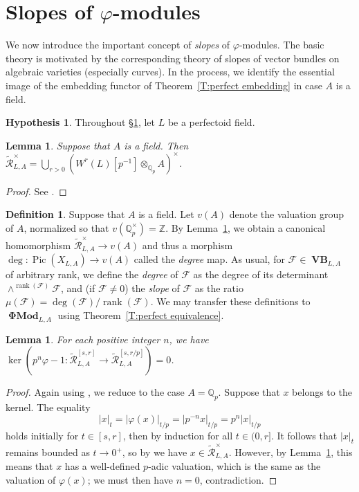 \documentclass[12pt]{amsart}
\newtheorem{lemma}[theorem]{Lemma}
\theoremstyle{definition}
\newtheorem{defn}[theorem]{Definition}
\newtheorem{hypothesis}[theorem]{Hypothesis}
\numberwithin{equation}{theorem}
\newcommand{\QQ}{\mathbb{Q}}
\newcommand{\ZZ}{\mathbb{Z}}
\newcommand{\calF}{\mathcal{F}}
\newcommand{\calR}{\mathcal{R}}
\DeclareMathOperator{\PhiMod}{\mathbf{\Phi Mod}}
\DeclareMathOperator{\Pic}{Pic}
\DeclareMathOperator{\rank}{rank}
\DeclareMathOperator{\VB}{\mathbf{VB}}
\begin{document}
\section{Slopes of \texorpdfstring{$\varphi$}{phi}-modules}
\label{sec:slopes}

We now introduce the important concept of \emph{slopes} of $\varphi$-modules. The basic theory is motivated by the corresponding theory of slopes of vector bundles on algebraic varieties (especially curves). In the process, we identify the essential image of the embedding functor of Theorem~\ref{T:perfect embedding} in case $A$ is a field.

\begin{hypothesis}
Throughout \S\ref{sec:slopes}, let $L$ be a perfectoid field.
\end{hypothesis}

\begin{lemma} \label{L:units}
Suppose that $A$ is a field.
Then $\tilde{\calR}_{L,A}^{\times} = \bigcup_{r>0} (W^r(L)[p^{-1}] \otimes_{\QQ_p} A)^\times$.
\end{lemma}
\begin{proof}
See \cite[Corollary~4.2.5]{kedlaya-liu1}.
\end{proof}

\begin{defn}
Suppose that $A$ is a field. Let $v(A)$ denote the valuation group of $A$, normalized so that $v(\QQ_p^\times) = \ZZ$. By Lemma~\ref{L:units},
we obtain a canonical homomorphism $\tilde{\calR}_{L,A}^{\times} \to v(A)$
and thus a morphism $\deg: \Pic(X_{L,A}) \to v(A)$ called the \emph{degree} map.
As usual, for $\calF \in \VB_{L,A}$ of arbitrary rank, we define the \emph{degree} of $\calF$ as the degree of its determinant $\wedge^{\rank(\calF)} \calF$, and (if $\calF \neq 0$) the \emph{slope} of $\calF$ as the ratio $\mu(\calF) = \deg(\calF)/\rank(\calF)$.
We may transfer these definitions to $\PhiMod_{L,A}$ using Theorem~\ref{T:perfect equivalence}.
\end{defn}

\begin{lemma} \label{L:no subinvariants}
For each positive integer $n$, we have
$\ker(p^n \varphi-1: \tilde{\calR}^{[s,r]}_{L,A} \to \tilde{\calR}^{[s,r/p]}_{L,A}) = 0$. \end{lemma}
\begin{proof}
Again using \cite[Lemma~2.2.9(b)]{kedlaya-liu1}, we reduce to the case $A = \QQ_p$.
Suppose that $x$ belongs to the kernel. The equality
\[
\left| x \right|_{t} = \left| \varphi(x) \right|_{t/p} = \left| p^{-n} x \right|_{t/p} 
= p^n \left| x \right|_{t/p}
\]
holds initially for $t \in [s, r]$, then by induction for all $t \in (0, r]$.
It follows that $\left| x \right|_t$ remains bounded as $t \to 0^+$, so by 
\cite[Lemma~4.2.4]{kedlaya-liu1} we have $x \in \tilde{\calR}_{L,A}^{\times}$.
However, by Lemma~\ref{L:units}, this means that $x$ has a well-defined $p$-adic valuation, which is the same as the valuation of $\varphi(x)$; we must then have $n=0$, contradiction.
\end{proof}
\end{document}
